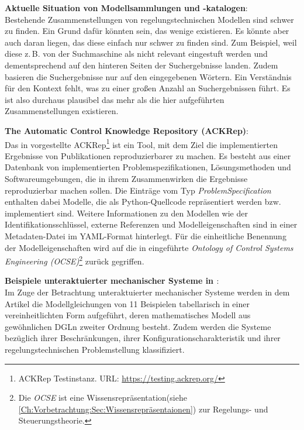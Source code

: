 \textbf{Aktuelle Situation von Modellsammlungen und -katalogen}: \\
Bestehende Zusammenstellungen von regelungstechnischen Modellen sind schwer zu finden. Ein Grund dafür könnten sein, das wenige existieren. Es könnte aber auch daran liegen, das diese einfach nur schwer zu finden sind. Zum Beispiel, weil diese z.\,B. von der Suchmaschine als nicht relevant eingestuft werden und dementsprechend auf den hinteren Seiten der Suchergebnisse landen. Zudem basieren die Suchergebnisse nur auf den eingegebenen Wörtern. Ein Verständnis für den Kontext fehlt, was zu einer großen Anzahl an Suchergebnissen führt. Es ist also durchaus plausibel das mehr als die hier aufgeführten Zusammenstellungen existieren. 

\textbf{The Automatic Control Knowledge Repository (ACKRep)}:\\
Das in \cite{KNHE20a} vorgestellte ACKRep\footnote{ACKRep Testinstanz. \tiny{URL}\normalsize: \url{https://testing.ackrep.org/}} ist ein Tool, mit dem Ziel die implementierten Ergebnisse von Publikationen reproduzierbarer zu machen. Es besteht aus einer Datenbank von implementierten Problemspezifikationen, Lösungsmethoden und Softwareumgebungen, die in ihrem Zusammenwirken die Ergebnisse reproduzierbar machen sollen. Die Einträge vom Typ \textit{ProblemSpecification} enthalten dabei Modelle, die als Python-Quellcode repräsentiert werden bzw. implementiert sind. Weitere Informationen zu den Modellen wie der Identifikationsschlüssel, externe Referenzen und Modelleigenschaften sind in einer Metadaten-Datei im YAML-Format hinterlegt. Für die einheitliche Benennung der Modelleigenschaften wird auf die in \cite{KNHE20b} eingeführte \textit{Ontology of Control Systems Engineering (OCSE)}\footnote{Die \textit{OCSE} ist eine Wissensrepräsentation(siehe \autoref{Ch:Vorbetrachtung:Sec:Wissensrepräsentaionen}) zur Regelungs- und Steuerungstheorie.} zurück gegriffen.

\textbf{Beispiele unteraktuierter mechanischer Systeme in \cite{LIYU13}}:\\
Im Zuge der Betrachtung unteraktuierter mechanischer Systeme werden in dem Artikel die Modellgleichungen von 11 Beispielen tabellarisch in einer vereinheitlichten Form aufgeführt, deren mathematisches Modell aus gewöhnlichen DGLn zweiter Ordnung besteht. Zudem werden die Systeme bezüglich ihrer Beschränkungen, ihrer Konfigurationscharakteristik und ihrer regelungstechnischen Problemstellung klassifiziert.

